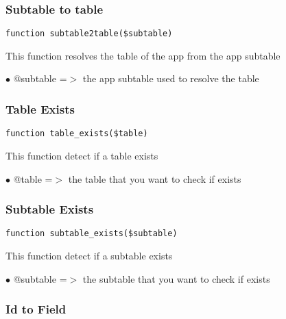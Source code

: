\documentclass[a4paper]{article}
\begin{document}
\hypertarget{toc35}{}
\subsubsection{Subtable to table}

\begin{lstlisting}
function subtable2table($subtable)
\end{lstlisting}

This function resolves the table of the app from the app subtable

\begin{compactitem}
\item[\color{myblue}$\bullet$] @subtable =$>$ the app subtable used to resolve the table
\end{compactitem}

\hypertarget{toc36}{}
\subsubsection{Table Exists}

\begin{lstlisting}
function table_exists($table)
\end{lstlisting}

This function detect if a table exists

\begin{compactitem}
\item[\color{myblue}$\bullet$] @table =$>$ the table that you want to check if exists
\end{compactitem}

\hypertarget{toc37}{}
\subsubsection{Subtable Exists}

\begin{lstlisting}
function subtable_exists($subtable)
\end{lstlisting}

This function detect if a subtable exists

\begin{compactitem}
\item[\color{myblue}$\bullet$] @subtable =$>$ the subtable that you want to check if exists
\end{compactitem}

\hypertarget{toc38}{}
\subsubsection{Id to Field}
\end{document}
